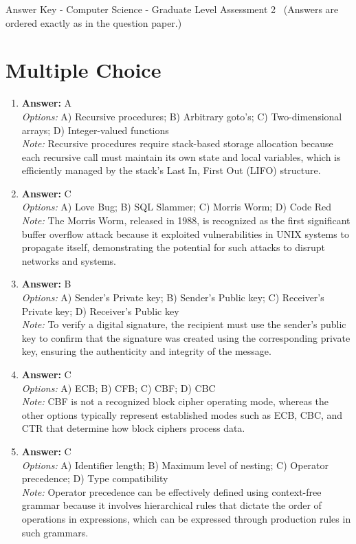 \documentclass[12pt]{article}
\begin{document}
\begin{center}
Answer Key - Computer Science - Graduate Level Assessment 2 \
\small (Answers are ordered exactly as in the question paper.)
\end{center}

\section*{Multiple Choice}
\begin{enumerate}[label=\arabic*.]
\item \textbf{Answer:} A
\\ \textit{Options:} A) Recursive procedures; B) Arbitrary goto's; C) Two-dimensional arrays; D) Integer-valued functions
\\ \textit{Note:} Recursive procedures require stack-based storage allocation because each recursive call must maintain its own state and local variables, which is efficiently managed by the stack's Last In, First Out (LIFO) structure.
\item \textbf{Answer:} C
\\ \textit{Options:} A) Love Bug; B) SQL Slammer; C) Morris Worm; D) Code Red
\\ \textit{Note:} The Morris Worm, released in 1988, is recognized as the first significant buffer overflow attack because it exploited vulnerabilities in UNIX systems to propagate itself, demonstrating the potential for such attacks to disrupt networks and systems.
\item \textbf{Answer:} B
\\ \textit{Options:} A) Sender's Private key; B) Sender's Public key; C) Receiver's Private key; D) Receiver's Public key
\\ \textit{Note:} To verify a digital signature, the recipient must use the sender's public key to confirm that the signature was created using the corresponding private key, ensuring the authenticity and integrity of the message.
\item \textbf{Answer:} C
\\ \textit{Options:} A) ECB; B) CFB; C) CBF; D) CBC
\\ \textit{Note:} CBF is not a recognized block cipher operating mode, whereas the other options typically represent established modes such as ECB, CBC, and CTR that determine how block ciphers process data.
\item \textbf{Answer:} C
\\ \textit{Options:} A) Identifier length; B) Maximum level of nesting; C) Operator precedence; D) Type compatibility
\\ \textit{Note:} Operator precedence can be effectively defined using context-free grammar because it involves hierarchical rules that dictate the order of operations in expressions, which can be expressed through production rules in such grammars.
\end{enumerate}
\end{document}
